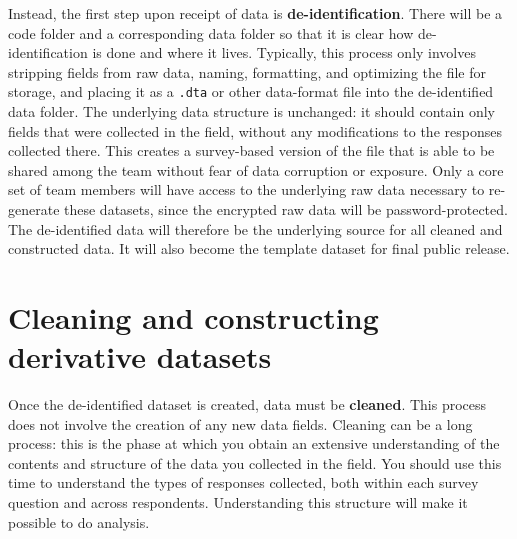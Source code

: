 Instead, the first step upon receipt of data is \textbf{de-identification}.
There will be a code folder and a corresponding data folder
so that it is clear how de-identification is done and where it lives.
Typically, this process only involves stripping fields from raw data,
naming, formatting, and optimizing the file for storage,
and placing it as a \texttt{.dta} or other data-format file
into the de-identified data folder.
The underlying data structure is unchanged:
it should contain only fields that were collected in the field,
without any modifications to the responses collected there.
This creates a survey-based version of the file that is able
to be shared among the team without fear of data corruption or exposure.
Only a core set of team members will have access to the underlying
raw data necessary to re-generate these datasets,
since the encrypted raw data will be password-protected.
The de-identified data will therefore be the underlying source
for all cleaned and constructed data.
It will also become the template dataset for final public release.


\section{Cleaning and constructing derivative datasets}

Once the de-identified dataset is created, data must be \textbf{cleaned}.
This process does not involve the creation of any new data fields.
Cleaning can be a long process: this is the phase at which
you obtain an extensive understanding of the contents and structure
of the data you collected in the field.
You should use this time to understand the types of responses collected,
both within each survey question and across respondents.
Understanding this structure will make it possible to do analysis.

